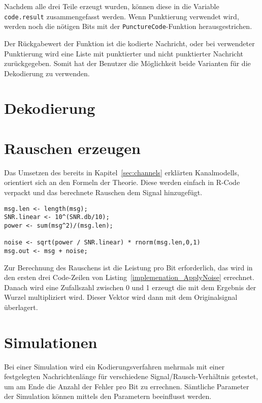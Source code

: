 Nachdem alle drei Teile erzeugt wurden, können diese in die Variable \texttt{code.result} zusammengefasst werden. Wenn Punktierung verwendet wird, werden noch die nötigen Bits mit der \texttt{PunctureCode}-Funktion herausgestrichen. 

Der Rückgabewert der Funktion ist die kodierte Nachricht, oder bei verwendeter Punktierung wird eine Liste mit punktierter und nicht punktierter Nachricht zurückgegeben. Somit hat der Benutzer die Möglichkeit beide Varianten für die Dekodierung zu verwenden.  

\FloatBarrier
\section{Dekodierung}
\label{sec:implementation_decode}

\FloatBarrier
\section{Rauschen erzeugen}
\label{sec:implementation_applyNoise}
Das Umsetzen des bereits in Kapitel~\ref{sec:channels} erklärten Kanalmodells, orientiert sich an den Formeln der Theorie. Diese werden einfach in R-Code verpackt und das berechnete Rauschen dem Signal hinzugefügt.  

\begin{lstlisting}[caption=Implementierung von \texttt{ApplyNoise}, label={lst:implemenation_ApplyNoise}, float=!th]
msg.len <- length(msg);
SNR.linear <- 10^(SNR.db/10);
power <- sum(msg^2)/(msg.len); 

noise <- sqrt(power / SNR.linear) * rnorm(msg.len,0,1)
msg.out <- msg + noise;
\end{lstlisting}

Zur Berechnung des Rauschens ist die Leistung pro Bit erforderlich, das wird in den ersten drei Code-Zeilen von Listing~\ref{implemenation_ApplyNoise} errechnet. Danach wird eine Zufallszahl zwischen 0 und 1 erzeugt die mit dem Ergebnis der Wurzel multipliziert wird. Dieser Vektor wird dann mit dem Originalsignal überlagert.

\FloatBarrier
\section{Simulationen}
\label{sec:implementation_simulation}
Bei einer Simulation wird ein Kodierungsverfahren mehrmals mit einer festgelegten Nachrichtenlänge für verschiedene Signal/Rausch-Verhältnis getestet, um am Ende die Anzahl der Fehler pro Bit zu errechnen. Sämtliche Parameter der Simulation können mittels den Parametern beeinflusst werden.

